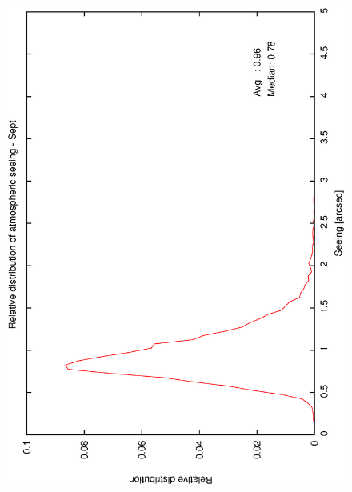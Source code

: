 {{\begin{figure}[htbp]
\begin{center}
{   \includegraphics[scale=0.25, angle=-90]{figures/ecs/corr_see_dist_sep.eps}   
   \label{fig:see_dist_sep}
  }
 \subfigure[] {
}
\end{center}
\end{figure}}}
